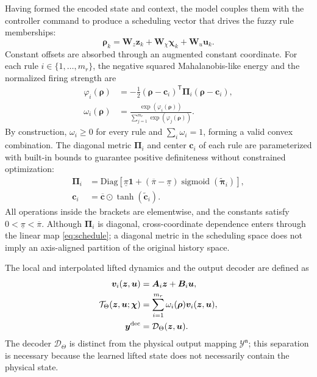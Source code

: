 \documentclass[journal]{IEEEtran}
\newcommand{\T}{\mathsf T}
\newcommand{\1}{\bm 1}
\begin{document}
Having formed the encoded state and context, the model couples them with the
controller command to produce a scheduling vector that drives the fuzzy rule
memberships:
\begin{equation}
\bm\rho_k=\bm W_z\bm z_k+\bm W_\chi\bm\chi_k+
\bm W_u\bm u_k.
\label{eq:schedule}
\end{equation}
Constant offsets are absorbed through an augmented constant coordinate.
For each rule $i\in\{1,\ldots,m_r\}$, the negative squared Mahalanobis-like
energy and the normalized firing strength are
\begin{equation}
\begin{aligned}
\varphi_i(\bm\rho)
&=-\frac{1}{2}(\bm\rho-\bm c_i)^\T
\bm\Pi_i(\bm\rho-\bm c_i),\\
\omega_i(\bm\rho)
&=\frac{\exp(\varphi_i(\bm\rho))}
{\displaystyle\sum_{j=1}^{m_r}\exp(\varphi_j(\bm\rho))}.
\end{aligned}
\label{eq:fuzzy_weights}
\end{equation}
By construction, $\omega_i\geq0$ for every rule and $\sum_i\omega_i=1$,
forming a valid convex combination. The diagonal metric $\bm\Pi_i$ and center
$\bm c_i$ of each rule are parameterized with built-in bounds to guarantee
positive definiteness without constrained optimization:
\begin{equation}
\begin{aligned}
\bm\Pi_i&=\mathrm{Diag}\!\left[
\underline{\pi}\1+
(\overline{\pi}-\underline{\pi})
\operatorname{sigmoid}(\widetilde{\bm\pi}_i)\right],\\
\bm c_i&=\overline{\bm c}\odot\tanh(\widetilde{\bm c}_i).
\end{aligned}
\label{eq:metric_parameterization}
\end{equation}
All operations inside the brackets are elementwise, and the constants satisfy
$0<\underline{\pi}<\overline{\pi}$. Although $\bm\Pi_i$ is diagonal,
cross-coordinate dependence enters through the linear map \eqref{eq:schedule};
a diagonal metric in the scheduling space does not imply an axis-aligned
partition of the original history space.

The local and interpolated lifted dynamics and the output decoder are defined
as
\begin{equation}
\begin{aligned}
\bm v_i(\bm z,\bm u)&=\bm A_i\bm z+\bm B_i\bm u,\\
\mathcal T_\Theta(\bm z,\bm u;\bm\chi)
&=\sum_{i=1}^{m_r}\omega_i(\bm\rho)\bm v_i(\bm z,\bm u),\\
\bm y^{\rm dec}&=\mathcal D_\Theta(\bm z,\bm u).
\end{aligned}
\label{eq:fuzzy_transition}
\end{equation}
The decoder $\mathcal D_\Theta$ is distinct from the physical output mapping
$\mathcal Y^{\mathfrak n}$; this separation is necessary because the learned
lifted state does not necessarily contain the physical state.
\end{document}
